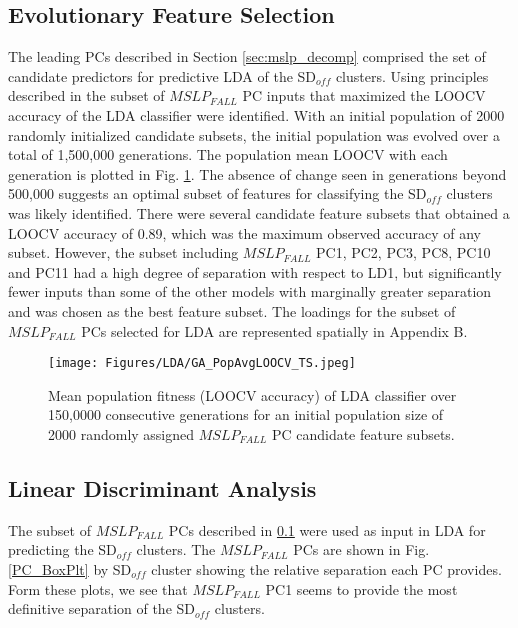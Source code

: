 \documentclass{tATO2e}
\newcommand{\sdoff}{SD$_{off}$}
\begin{document}
\subsection{Evolutionary Feature Selection}\label{ga_feat_selec}
The leading PCs described in Section \ref{sec:mslp_decomp} comprised the set of candidate predictors for predictive LDA of the \sdoff{} clusters. Using principles described in \cite{Mitchell1998} the subset of $MSLP_{FALL}$ PC inputs that maximized the LOOCV accuracy of the LDA classifier were identified. With an initial population of 2000 randomly initialized candidate subsets, the initial population was evolved over a total of 1,500,000 generations. The population mean LOOCV with each generation is plotted in Fig. \ref{fig:GA_pop_fit}. The absence of change seen in generations beyond 500,000 suggests an optimal subset of features for classifying the \sdoff{} clusters was likely identified. There were several candidate feature subsets that obtained a LOOCV accuracy of 0.89, which was the maximum observed accuracy of any subset. However, the subset including $MSLP_{FALL}$ PC1, PC2, PC3, PC8, PC10 and PC11 had a high degree of separation with respect to LD1, but significantly fewer inputs than some of the other models with marginally greater separation and was chosen as the best feature subset. The loadings for the subset of $MSLP_{FALL}$ PCs selected for LDA are represented spatially in Appendix B.  


\begin{figure}
	\begin{center}
		\texttt{[image: Figures/LDA/GA\_PopAvgLOOCV\_TS.jpeg]}
		\caption{Mean population fitness (LOOCV accuracy) of LDA classifier over 150,0000 consecutive generations for an initial population size of 2000 randomly assigned $MSLP_{FALL}$ PC candidate feature subsets.}
		\label{fig:GA_pop_fit}
	\end{center}
\end{figure}


\subsection{Linear Discriminant Analysis}
The subset of $MSLP_{FALL}$ PCs described in \ref{ga_feat_selec} were used as input in LDA for predicting the \sdoff{} clusters. The $MSLP_{FALL}$ PCs are shown in Fig. \ref{PC_BoxPlt} by \sdoff{} cluster showing the relative separation each PC provides. Form these plots, we see that $MSLP_{FALL}$ PC1 seems to provide the most definitive separation of the \sdoff{} clusters. 
\end{document}
